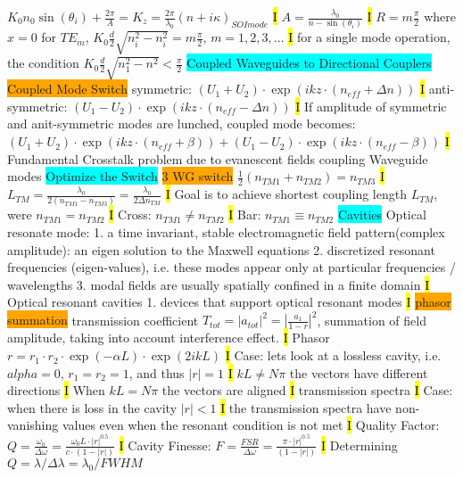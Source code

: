 \documentclass[fontsize=3]{scrartcl}
\begin{document}
$K_0 n_0 \sin(\theta_i) + \frac{2\pi}{A} = K_z = \frac{2\pi}{\lambda_0}(n + i\kappa)_{SOI mode}$
\hl{I}
$A = \frac{\lambda_0}{n - \sin(\theta_i)}$
\hl{I}
$R = m \frac{\pi}{2}$ where $x=0$ for $TE_m$, $K_0 \frac{d}{2}\sqrt{n_i^2 - n_i^2} = m\frac{\pi}{2}$, $m = 1,2,3,...$
\hl{I}
for a single mode operation, the condition $K_0 \frac{d}{2}\sqrt{n_1^2 - n^2} < \frac{\pi}{2}$
\colorbox{Cyan}{Coupled Waveguides to Directional Couplers}
\colorbox{Orange}{Coupled Mode Switch}
symmetric: $(U_1 + U_2)\cdot \exp(ikz \cdot (n_{eff} + \Delta n))$
\hl{I}
anti-symmetric: $(U_1 - U_2)\cdot \exp(ikz \cdot (n_{eff} - \Delta n))$
\hl{I}
If amplitude of symmetric and anit-symmetric modes are lunched,
coupled mode becomes: $(U_1 + U_2)\cdot \exp(ikz \cdot (n_{eff} + \beta)) + (U_1 - U_2)\cdot \exp(ikz \cdot (n_{eff} - \beta))$
\hl{I}
Fundamental Crosstalk problem due to evanescent fields coupling Waveguide modes
\colorbox{Cyan}{Optimize the Switch}
\colorbox{Orange}{3 WG switch}
$\frac{1}{2}(n_{TM1}+n_{TM2})=n_{TM3}$
\hl{I}
$L_{TM}  = \frac{\lambda_0}{2(n_{TM1} - n_{TM3})} = \frac{\lambda_0}{2\Delta n_{TM}}$
\hl{I}
Goal is to achieve shortest coupling length $L_{TM}$, were $n_{TM1}  = n_{TM2}$
\hl{I}
Cross: $n_{TM1} \neq n_{TM2}$
\hl{I}
Bar: $n_{TM1} \equiv n_{TM2}$
\colorbox{Cyan}{Cavities}
Optical resonate mode: 
1. a time invariant, stable electromagnetic field pattern(complex amplitude): an eigen solution to the Maxwell equations
2. discretized resonant frequencies (eigen-values), i.e. these modes appear only at particular frequencies / wavelengths
3. modal fields are usually spatially confined in a finite domain
\hl{I}
Optical resonant cavities
1. devices that support optical resonant modes
\hl{I}
\colorbox{Orange}{phasor summation}
transmission coefficient $T_{tot} = |a_{tot}|^2 = |\frac{a_1}{1-r}|^2$, summation of field amplitude, taking into account interference effect.
\hl{I}
Phasor $r = r_1 \cdot r_2 \cdot \exp(-\alpha L) \cdot \exp(2ikL)$
\hl{I}
Case: lets look at a lossless cavity, i.e. $alpha = 0$, $r_1 = r_2 =1$, and thus $|r| = 1$
\hl{I}
$kL \neq N \pi$ the vectors have different directions
\hl{I}
When $kL = N\pi$ the vectors are aligned
\hl{I}
transmission spectra
\hl{I}
Case: when there is loss in the cavity $|r| < 1$
\hl{I}
the transmission spectra have non-vanishing values even when the resonant condition is not met
\hl{I}
Quality Factor: $Q = \frac{\omega_0}{\Delta \omega} = \frac{\omega_0 L \cdot |r|^{0.5}}{c \cdot (1-|r|)}$
\hl{I}
Cavity Finesse: $F = \frac{FSR}{\Delta \omega} = \frac{\pi \cdot |r|^{0.5}}{(1-|r|)}$
\hl{I}
Determining $Q = \lambda / \Delta \lambda = \lambda_0 / FWHM$
\end{document}
